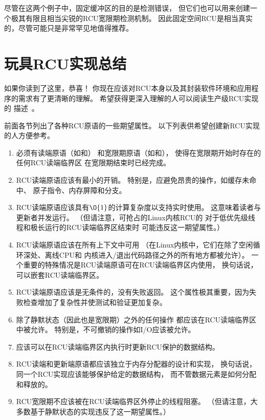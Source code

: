 尽管在这两个例子中，固定缓冲区的目的是检测错误，
但它们也可以用来创建一个极其有限且相当尖锐的RCU宽限期检测机制。
因此固定空间RCU是相当真实的，尽管可能只是非常罕见地值得推荐。

\section{玩具RCU实现总结}
\label{sec:app:toyrcu:Summary of Toy RCU Implementations}

如果你读到了这里，恭喜！
你现在应该对RCU本身以及其封装软件环境和应用程序的需求有了更清晰的理解。
希望获得更深入理解的人可以阅读生产级RCU实现的
描述~\cite{MathieuDesnoyers2012URCU,PaulEMcKenney2007PreemptibleRCU,PaulEMcKenney2008HierarchicalRCU,PaulEMcKenney2009BloatwatchRCU}。

前面各节列出了各种RCU原语的一些期望属性。
以下列表供希望创建新RCU实现的人方便参考。

\begin{enumerate}
\item	必须有读端原语（如和）
	和宽限期原语（如和），
	使得在宽限期开始时存在的任何RCU读端临界区
	在宽限期结束时已经完成。
\item	RCU读端原语应该有最小的开销。
	特别是，应避免昂贵的操作，如缓存未命中、
	原子指令、内存屏障和分支。
\item	RCU读端原语应该具有$\O{1}$的计算复杂度以支持实时使用。
	这意味着读者与更新者并发运行。
	（但请注意，可抢占的Linux内核RCU的
	对于低优先级线程和极长运行的RCU读端临界区结束时
	可能违反这一期望属性。）
\item	RCU读端原语应该在所有上下文中可用
	（在Linux内核中，它们在除了空闲循环深处、离线CPU和
	内核进入/退出代码路径之外的所有地方都被允许）。
	一个重要的特殊情况是RCU读端原语可在RCU读端临界区内使用，
	换句话说，可以嵌套RCU读端临界区。
\item	RCU读端原语应该是无条件的，没有失败返回。
	这个属性极其重要，因为失败检查增加了复杂性并使测试和验证更加复杂。
\item	除了静默状态（因此也是宽限期）之外的任何操作
	都应该在RCU读端临界区中被允许。
	特别是，不可撤销的操作如I/O应该被允许。
\item	应该可以在RCU读端临界区内执行时更新RCU保护的数据结构。
\item	RCU读端和更新端原语都应该独立于内存分配器的设计和实现，
	换句话说，同一个RCU实现应该能够保护给定的数据结构，
	而不管数据元素是如何分配和释放的。
\item	RCU宽限期不应该被在RCU读端临界区外停止的线程阻塞。
	（但请注意，大多数基于静默状态的实现违反了这一期望属性。）
\end{enumerate}

